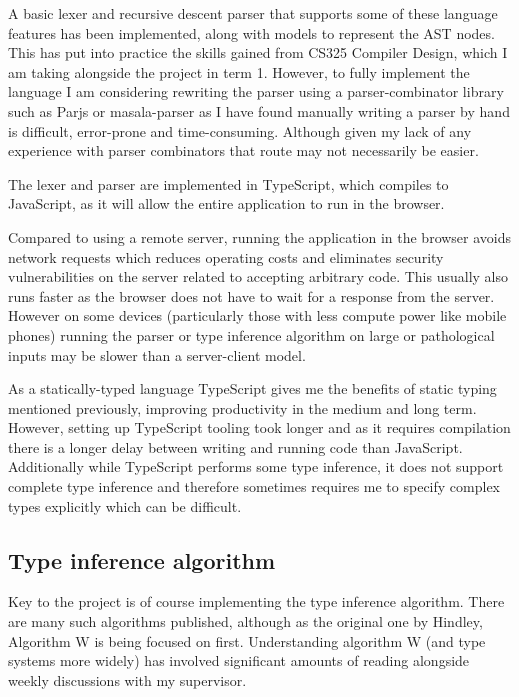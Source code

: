 \documentclass[a4paper,fleqn,12pt]{article}
\begin{document}
A basic lexer and recursive descent parser that supports some of these language features has been implemented, along with models to represent the AST nodes. This has put into practice the skills gained from CS325 Compiler Design, which I am taking alongside the project in term 1. However, to fully implement the language I am considering rewriting the parser using a parser-combinator library such as Parjs \citep{ref6} or masala-parser \citep{ref7} as I have found manually writing a parser by hand is difficult, error-prone and time-consuming. Although given my lack of any experience with parser combinators that route may not necessarily be easier.

The lexer and parser are implemented in TypeScript, which compiles to JavaScript, as it will allow the entire application to run in the browser.

Compared to using a remote server, running the application in the browser avoids network requests which reduces operating costs and eliminates security vulnerabilities on the server related to accepting arbitrary code. This usually also runs faster as the browser does not have to wait for a response from the server. However on some devices (particularly those with less compute power like mobile phones) running the parser or type inference algorithm on large or pathological inputs may be slower than a server-client model.

As a statically-typed language TypeScript gives me the benefits of static typing mentioned previously, improving productivity in the medium and long term. However, setting up TypeScript tooling took longer and as it requires compilation there is a longer delay between writing and running code than JavaScript. Additionally while TypeScript performs some type inference, it does not support complete type inference and therefore sometimes requires me to specify complex types explicitly which can be difficult.

\subsection{Type inference algorithm}\label{id:h.el6sta7fzq4a}

Key to the project is of course implementing the type inference algorithm. There are many such algorithms published, although as the original one by Hindley, Algorithm W is being focused on first. Understanding algorithm W (and type systems more widely) has involved significant amounts of reading alongside weekly discussions with my supervisor.
\end{document}
